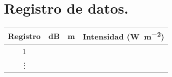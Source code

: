 \documentclass[14pt]{extarticle}
\begin{document}
\section{Registro de datos.}

\begin{table}[H]
\centering
\begin{tabular}{| c | c | c | c |} \hline
Registro & \unit{dB} & \unit{\meter} & Intensidad (\unit{\watt\per\square\meter}) \\ \hline
1 & & & \\ \hline    
\vdots & & & \\ \hline    
\end{tabular}
\end{table}
\end{document}
